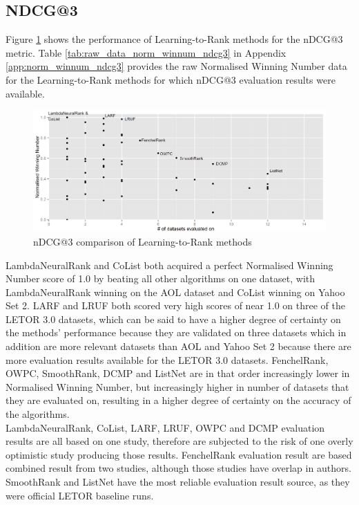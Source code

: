 \subsection{NDCG@3}
Figure \ref{fig:normalised_winning_number_ndcg3} shows the performance of Learning-to-Rank methods for the \ac{nDCG}@3 metric. Table \ref{tab:raw_data_norm_winnum_ndcg3} in Appendix \ref{app:norm_winnum_ndcg3} provides the raw Normalised Winning Number data for the Learning-to-Rank methods for which \ac{nDCG}@3 evaluation results were available.\\

\begin{figure}[!h]
\includegraphics[scale=0.285]{gfx/ndcg3_winnum}
\caption{\acs{nDCG}@3 comparison of Learning-to-Rank methods}
\label{fig:normalised_winning_number_ndcg3}
\end{figure}

LambdaNeuralRank and CoList both acquired a perfect Normalised Winning Number score of 1.0 by beating all other algorithms on one dataset, with LambdaNeuralRank winning on the AOL dataset and CoList winning on Yahoo Set 2. LARF and LRUF both scored very high scores of near 1.0 on three of the LETOR 3.0 datasets, which can be said to have a higher degree of certainty on the methods' performance because they are validated on three datasets which in addition are more relevant datasets than AOL and Yahoo Set 2 because there are more evaluation results available for the LETOR 3.0 datasets. FenchelRank, OWPC, SmoothRank, DCMP and ListNet are in that order increasingly lower in Normalised Winning Number, but increasingly higher in number of datasets that they are evaluated on, resulting in a higher degree of certainty on the accuracy of the algorithms.\\

LambdaNeuralRank, CoList, LARF, LRUF, OWPC and DCMP evaluation results are all based on one study, therefore are subjected to the risk of one overly optimistic study producing those results. FenchelRank evaluation result are based combined result from two studies, although those studies have overlap in authors. SmoothRank and ListNet have the most reliable evaluation result source, as they were official LETOR baseline runs.  

